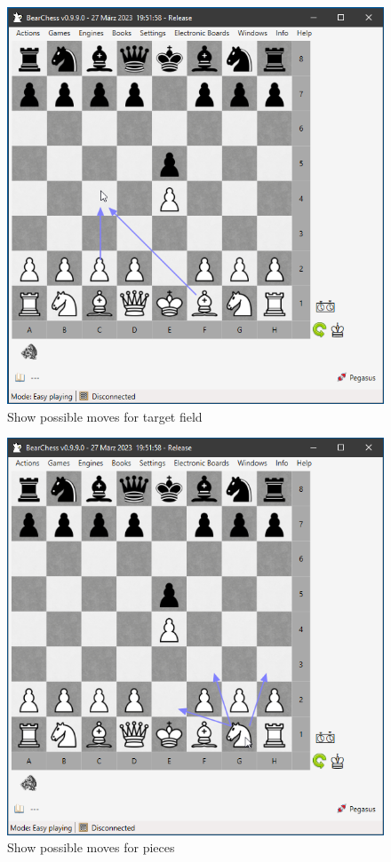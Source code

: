 \documentclass[11pt,a4paper]{article}
\begin{document}
	
	\begin{figure}[H]
		\centering
		\includegraphics[scale=0.8]{SettingsBoardAndPieces5.png}
		\caption{Show possible moves for target field}
		\label{fig:ShowPossibleMoves}
	\end{figure}
	
	
	\begin{figure}[H]
		\centering
		\includegraphics[scale=0.8]{SettingsBoardAndPieces6.png}
		\caption{Show possible moves for pieces}
		\label{fig:ShowPossibleMoves2}
	\end{figure}
	
\end{document}
